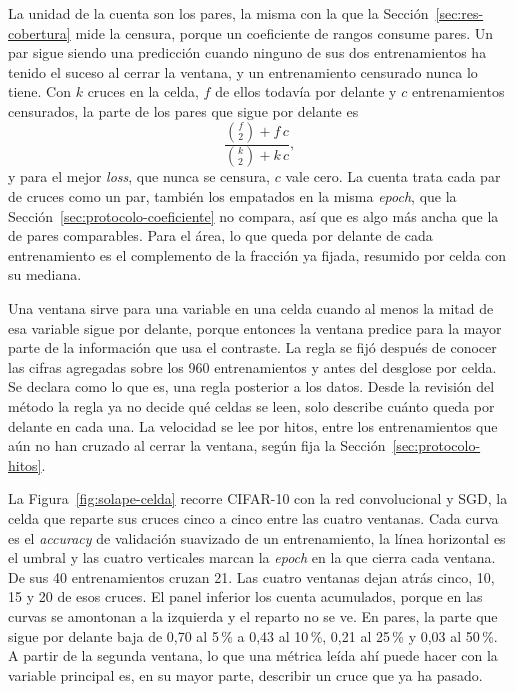 La unidad de la cuenta son los pares, la misma con la que la Sección~\ref{sec:res-cobertura} mide la censura, porque un coeficiente de rangos consume pares. Un par sigue siendo una predicción cuando ninguno de sus dos entrenamientos ha tenido el suceso al cerrar la ventana, y un entrenamiento censurado nunca lo tiene. Con $k$ cruces en la celda, $f$ de ellos todavía por delante y $c$ entrenamientos censurados, la parte de los pares que sigue por delante es
\begin{equation}
\frac{\binom{f}{2} + f\,c}{\binom{k}{2} + k\,c},
\label{eq:pares-delante}
\end{equation}
y para el mejor \emph{loss}, que nunca se censura, $c$ vale cero. La cuenta trata cada par de cruces como un par, también los empatados en la misma \emph{epoch}, que la Sección~\ref{sec:protocolo-coeficiente} no compara, así que es algo más ancha que la de pares comparables. Para el área, lo que queda por delante de cada entrenamiento es el complemento de la fracción ya fijada, resumido por celda con su mediana.

Una ventana sirve para una variable en una celda cuando al menos la mitad de esa variable sigue por delante, porque entonces la ventana predice para la mayor parte de la información que usa el contraste. La regla se fijó después de conocer las cifras agregadas sobre los 960 entrenamientos y antes del desglose por celda. Se declara como lo que es, una regla posterior a los datos. Desde la revisión del método la regla ya no decide qué celdas se leen, solo describe cuánto queda por delante en cada una. La velocidad se lee por hitos, entre los entrenamientos que aún no han cruzado al cerrar la ventana, según fija la Sección~\ref{sec:protocolo-hitos}.

La Figura~\ref{fig:solape-celda} recorre CIFAR-10 con la red convolucional y SGD, la celda que reparte sus cruces cinco a cinco entre las cuatro ventanas. Cada curva es el \emph{accuracy} de validación suavizado de un entrenamiento, la línea horizontal es el umbral y las cuatro verticales marcan la \emph{epoch} en la que cierra cada ventana. De sus 40 entrenamientos cruzan 21. Las cuatro ventanas dejan atrás cinco, 10, 15 y 20 de esos cruces. El panel inferior los cuenta acumulados, porque en las curvas se amontonan a la izquierda y el reparto no se ve. En pares, la parte que sigue por delante baja de 0,70 al 5\,\% a 0,43 al 10\,\%, 0,21 al 25\,\% y 0,03 al 50\,\%. A partir de la segunda ventana, lo que una métrica leída ahí puede hacer con la variable principal es, en su mayor parte, describir un cruce que ya ha pasado.

